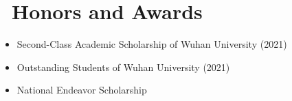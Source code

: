 \documentclass{resume}
\begin{document}



\section{\faTrophy\ Honors and Awards}
\begin{itemize}[parsep=0.5ex]
  \item Second-Class Academic Scholarship of Wuhan University (2021)
  \item Outstanding Students of Wuhan University (2021)
  \item National Endeavor Scholarship
\end{itemize}

%
%
\end{document}

